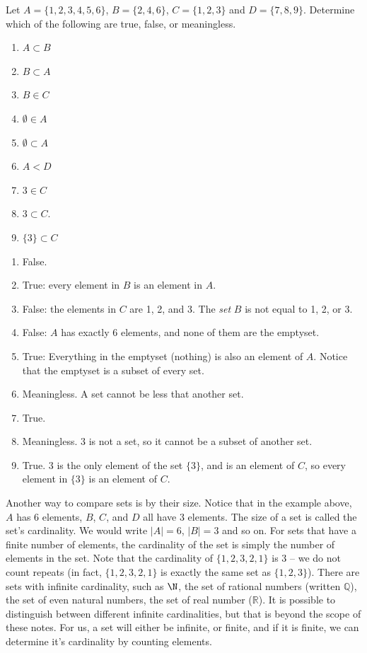 \begin{example}
 Let $A = \{1, 2, 3, 4, 5, 6\}$, $B = \{2, 4, 6\}$, $C = \{1, 2, 3\}$ and $D = \{7, 8, 9\}$.  Determine which of the following are true, false, or meaningless.
\begin{multicols}{3}
\begin{enumerate}
\item $A \subset B$
\item $B \subset A$
\item $B \in C$
\item $\emptyset \in A$
\item $\emptyset \subset A$
\item $A < D$
\item $3 \in C$
\item $3 \subset C$.
\item $\{3\} \subset C$
\end{enumerate}
\end{multicols}
\begin{solution}
 \begin{enumerate}
  \item False.
\item True: every element in $B$ is an element in $A$.
\item False: the elements in $C$ are 1, 2, and 3.  The {\em set} $B$ is not equal to 1, 2, or 3.
\item False: $A$ has exactly 6 elements, and none of them are the emptyset.
\item True: Everything in the emptyset (nothing) is also an element of $A$.  Notice that the emptyset is a subset of every set.
\item Meaningless.  A set cannot be less that another set.
\item True.
\item Meaningless.  $3$ is not a set, so it cannot be a subset of another set.
\item True.  $3$ is the only element of the set $\{3\}$, and is an element of $C$, so every element in $\{3\}$ is an element of $C$.
 \end{enumerate}
\end{solution}
\end{example}

Another way to compare sets is by their size.  Notice that in the example above, $A$ has 6 elements, $B$, $C$, and $D$ all have 3 elements.  The size of a set is called the set's cardinality.  We would write $|A| = 6$, $|B| = 3$ and so on.  For sets that have a finite number of elements, the cardinality of the set is simply the number of elements in the set.  Note that the cardinality of $\{ 1, 2, 3, 2, 1\}$ is 3 -- we do not count repeats (in fact, $\{1, 2, 3, 2, 1\}$ is exactly the same set as $\{1, 2, 3\}$).  There are sets with infinite cardinality, such as $\N$, the set of rational numbers (written $\mathbb Q$), the set of even natural numbers, the set of real number ($\mathbb R$).  It is possible to distinguish between different infinite cardinalities, but that is beyond the scope of these notes.  For us, a set will either be infinite, or finite, and if it is finite, we can determine it's cardinality by counting elements.


